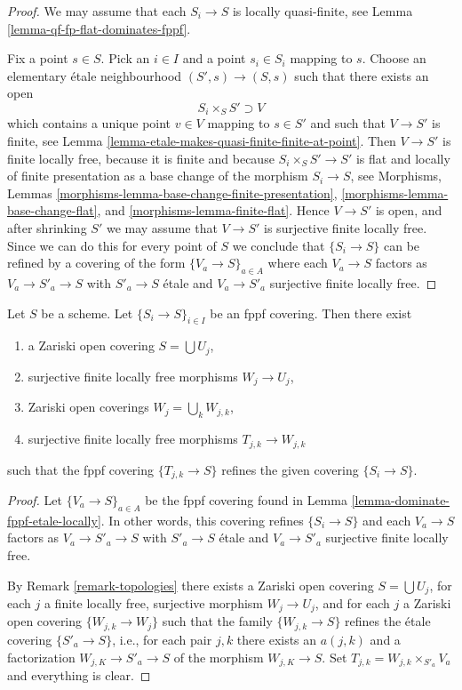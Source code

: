 \begin{proof}
We may assume that each $S_i \to S$ is locally quasi-finite, see
Lemma \ref{lemma-qf-fp-flat-dominates-fppf}.

\medskip\noindent
Fix a point $s \in S$. Pick an $i \in I$ and a point
$s_i \in S_i$ mapping to $s$. Choose an elementary \'etale neighbourhood
$(S', s) \to (S, s)$ such that there exists an open
$$
S_i \times_S S'  \supset V
$$
which contains a unique point $v \in V$ mapping to $s \in S'$
and such that $V \to S'$ is finite, see
Lemma \ref{lemma-etale-makes-quasi-finite-finite-at-point}.
Then $V \to S'$ is finite locally free, because it is finite
and because $S_i \times_S S' \to S'$ is flat and locally of finite presentation
as a base change of the morphism $S_i \to S$, see
Morphisms, Lemmas \ref{morphisms-lemma-base-change-finite-presentation},
\ref{morphisms-lemma-base-change-flat}, and
\ref{morphisms-lemma-finite-flat}.
Hence $V \to S'$ is open, and after shrinking $S'$
we may assume that $V \to S'$ is surjective finite locally free.
Since we can do this for every point of $S$ we conclude that
$\{S_i \to S\}$ can be refined by a covering of the form
$\{V_a \to S\}_{a \in A}$ where each $V_a \to S$ factors as
$V_a \to S'_a \to S$ with $S'_a \to S$ \'etale and $V_a \to S'_a$ surjective
finite locally free.
\end{proof}

\begin{lemma}
\label{lemma-dominate-fppf}
Let $S$ be a scheme. Let $\{S_i \to S\}_{i \in I}$ be an fppf covering.
Then there exist
\begin{enumerate}
\item a Zariski open covering $S = \bigcup U_j$,
\item surjective finite locally free morphisms $W_j \to U_j$,
\item Zariski open coverings $W_j = \bigcup_k W_{j, k}$,
\item surjective finite locally free morphisms $T_{j, k} \to W_{j, k}$
\end{enumerate}
such that the fppf covering $\{T_{j, k} \to S\}$ refines the given
covering $\{S_i \to S\}$.
\end{lemma}

\begin{proof}
Let $\{V_a \to S\}_{a \in A}$ be the fppf covering found in
Lemma \ref{lemma-dominate-fppf-etale-locally}.
In other words, this covering refines
$\{S_i \to S\}$
and each $V_a \to S$ factors as
$V_a \to S'_a \to S$ with $S'_a \to S$ \'etale and $V_a \to S'_a$
surjective finite locally free.

\medskip\noindent
By
Remark \ref{remark-topologies}
there exists a Zariski open covering $S = \bigcup U_j$,
for each $j$ a finite locally free, surjective morphism
$W_j \to U_j$, and for each $j$ a Zariski open covering
$\{W_{j, k} \to W_j\}$ such that the family
$\{W_{j, k} \to S\}$ refines the \'etale covering
$\{S'_a \to S\}$, i.e., for each pair $j, k$ there exists
an $a(j, k)$ and a factorization $W_{j, K} \to S'_a \to S$
of the morphism $W_{j, K} \to S$. Set
$T_{j, k} = W_{j, k} \times_{S'_a} V_a$ and everything is clear.
\end{proof}

